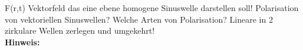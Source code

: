 \begin{question}[section=,subsection=,name={Vektorfeld einer homogenen Sinuswelle},difficulty=,type=mdl,mode=exm,tags={}]
	F(r,t) Vektorfeld das eine ebene homogene Sinuswelle darstellen soll!
	Polarisation von vektoriellen Sinuswellen?
	Welche Arten von Polarisation?
	Lineare in 2 zirkulare Wellen zerlegen und umgekehrt!
	\\ \textbf{Hinweis:}\\
	
\end{question}
\begin{solution}
	
\end{solution}